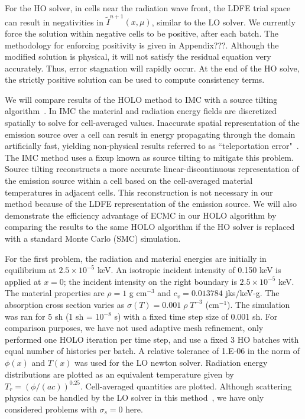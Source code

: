 \documentclass{mc2013}
\begin{document}
For the HO solver, in cells near the radiation wave front, the LDFE trial space can result in negativities in
$\tilde{I}^{n+1}(x,\mu)$, similar to the LO solver.  We currently force the solution within negative cells to be
positive, after each batch. The methodology for enforcing positivity is given in Appendix???.
  Although the modified solution is
physical, it will not satisfy the residual equation very accurately.  Thus, error stagnation will
rapidly occur. At the end of the HO solve, the strictly positive solution can be used
to compute consistency terms.


We will compare results of the HOLO method to IMC with
a source tilting algorithm~\cite{jayenne}. In IMC the material and radiation energy fields are discretized spatially to solve for cell-averaged values.
Inaccurate spatial representation of the emission source over a cell can result in
energy propagating through the domain artificially fast, yielding non-physical
results referred to as ``teleportation error"~\cite{teleportation}.  The IMC method uses a fixup known as source tilting
to mitigate this problem.  Source tilting reconstructs a more accurate
linear-discontinuous representation of the
emission source within a cell based on the cell-averaged material temperatures in adjacent
cells. This reconstruction is not necessary in our method because of the LDFE representation of the
emission source. We will also demonstrate the efficiency advantage of ECMC in our HOLO
algorithm by comparing the results to the same HOLO algorithm if the HO solver
is replaced with a standard Monte Carlo (SMC) simulation.





For the first problem, the radiation and material energies are initially in
equilibrium at $2.5\times 10^{-5}$ keV.   An isotropic incident intensity of 0.150 keV is applied
at $x=0$; the incident intensity on the right boundary is $2.5\times10^{-5}$ keV.
The material properties are $\rho = 1$ g cm$^{-3}$ and $c_v = 0.013784$ jks/keV-g. The
absorption cross section varies as $\sigma(T) = 0.001\;\rho\; T^{-3}$ (cm$^{-1}$). The simulation was ran for 5 sh (1 sh =
10$^{-8}$ s) with a fixed time step size of 0.001 sh. For comparison purposes, we
have not used adaptive mesh
refinement, only performed one HOLO iteration per time
step, and use a fixed 3 HO batches with equal number of histories per batch. A relative tolerance of 1.E-06 in the
norm of $\phi(x)$ and $T(x)$ was used for the LO newton solver. Radiation energy
distributions are plotted as an equivalent temperature given by
$T_r=(\phi/(ac))^{0.25}$.  Cell-averaged quantities are plotted.
Although scattering physics
can be handled by the LO solver in this method~\cite{ans_2014}, we have only
considered problems with $\sigma_s = 0$ here.  
\end{document}
